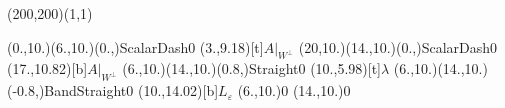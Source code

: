 \unitlength=1bp%

\begin{feynartspicture}(200,200)(1,1)

\FADiagram{}
\FAProp(0.,10.)(6.,10.)(0.,){ScalarDash}{0}
\FALabel(3.,9.18)[t]{$A|_{W^\perp}$}
\FAProp(20,10.)(14.,10.)(0.,){ScalarDash}{0}
\FALabel(17.,10.82)[b]{$A|_{W^\perp}$}
\FAProp(6.,10.)(14.,10.)(0.8,){Straight}{0}
\FALabel(10.,5.98)[t]{$\lambda$}
\FAProp(6.,10.)(14.,10.)(-0.8,){BandStraight}{0}
\FALabel(10.,14.02)[b]{$L_\varepsilon$}
\FAVert(6.,10.){0}
\FAVert(14.,10.){0}
\end{feynartspicture}

